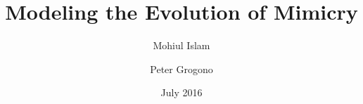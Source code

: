 \documentclass{beamer}
\title[Modeling the Evolution of Mimicry]{Modeling the Evolution of Mimicry}
\author[Islam, Grogono] %
{Mohiul Islam\inst{1} \and Peter Grogono\inst{1}}
\institute[Concordia] %
{
  \inst{1}%
  Faculty of Engineering \& Computer Science\\
  Concordia University\\
	Montreal, Canada
}
\date[ALIFE 2016] %
{July 2016}
\begin{document}
\frame{\titlepage}

%

\section[Outline]{}
\frame{\tableofcontents}

%



%

\end{document}
